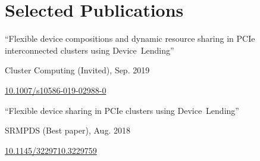 \section{Selected Publications}

\newcommand{\pub}[5]{
	\parbox[t][][t]{\linewidth}{%
		\begin{small}
		\parbox{\linewidth}{{``#4''}}
		\smallbreak
		\parbox{\linewidth}{{#2}, {#1}}
		\parbox{\linewidth}{{\href{https://doi.org/#3}{#3}}}
		\end{small}
	}
	\bigbreak
	\smallskip
}

\pub{Sep. 2019}{Cluster Computing (Invited)}{10.1007/s10586-019-02988-0}{Flexible device compositions and dynamic resource
sharing in PCIe interconnected clusters using Device~Lending}{%
Virtualization; KVM; Peer-to-Peer; Qemu; NTB; Virtual Machines; Cloud Computing;
Composable Infrastructure;
}

\pub{Aug. 2018}{SRMPDS (Best paper)}{10.1145/3229710.3229759}{Flexible device sharing in PCIe clusters using
Device~Lending}{%
Paravirtualizaiton; KVM, Virtual Machines;
}

